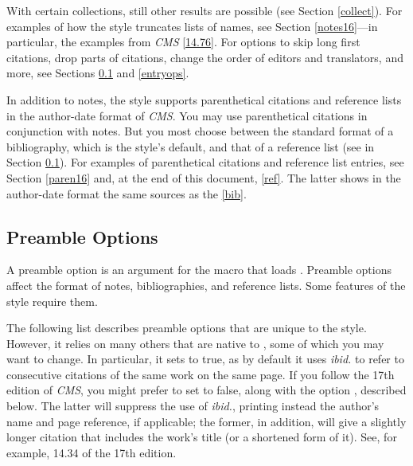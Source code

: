 \documentclass[11pt,letterpaper,oneside]{article}
\begin{document}
With certain collections, still other results are possible (see
Section \ref{collect}). For examples of how the style truncates lists
of names, see Section \ref{notes16}---in particular, the examples from
\textit{CMS} \ref{14.76}. For options to skip long first citations,
drop parts of citations, change the order of editors and translators,
and more, see Sections \ref{preops} and \ref{entryops}.

In addition to notes, the style supports parenthetical citations and
reference lists in the author-date format of \textit{CMS}. You may use
parenthetical citations in conjunction with notes. But you most choose
between the standard format of a bibliography, which is the style's
default, and that of a reference list (see  in Section
\ref{preops}). For examples of parenthetical citations and reference
list entries, see Section \ref{paren16} and, at the end of this
document, \ref{ref}. The latter shows in the author-date format the
same sources as the \ref{bib}.

\subsection{Preamble Options}
\label{preops}

A preamble option is an argument for the  macro that
loads \biblatex. Preamble options affect the format of notes,
bibliographies, and reference lists. Some features of the style
require them.

The following list describes preamble options that are unique to the
style. However, it relies on many others that are native to \biblatex,
some of which you may want to change. In particular, it sets
 to true, as by default it uses \textit{ibid.} to
refer to consecutive citations of the same work on the same page. If
you follow the 17th edition of \textit{CMS}, you might prefer to set
 to false, along with the option ,
described below. The latter will suppress the use of \textit{ibid.},
printing instead the author's name and page reference, if applicable;
the former, in addition, will give a slightly longer citation that
includes the work's title (or a shortened form of it). See, for
example, 14.34 of the 17th edition.
\end{document}

